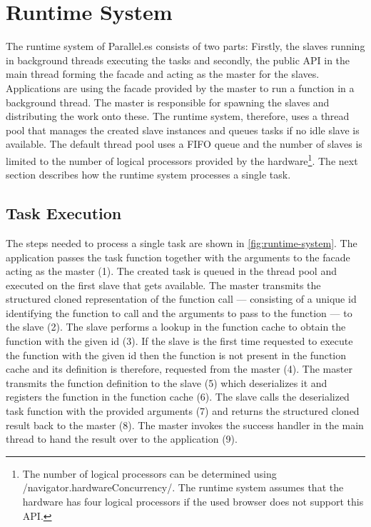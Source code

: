 \section{Runtime System}\label{sec:runtime-system}
The runtime system of Parallel.es consists of two parts: Firstly, the slaves running in background threads executing the tasks and secondly, the public API in the main thread forming the facade and acting as the master for the slaves. Applications are using the facade provided by the master to run a function in a background thread. The master is responsible for spawning the slaves and distributing the work onto these. The runtime system, therefore, uses a thread pool that manages the created slave instances and queues tasks if no idle slave is available. The default thread pool uses a FIFO queue and the number of slaves is limited to the number of logical processors provided by the hardware\footnote{The number of logical processors can be determined using \javascriptinline/navigator.hardwareConcurrency/. The runtime system assumes that the hardware has four logical processors if the used browser does not support this API.}. The next section describes how the runtime system processes a single task. 

\subsection{Task Execution}
The steps needed to process a single task are shown in \cref{fig:runtime-system}. The application passes the task function together with the arguments to the facade acting as the master (1). The created task is queued in the thread pool and executed on the first slave that gets available. The master transmits the structured cloned representation of the function call --- consisting of a unique id identifying the function to call and the arguments to pass to the function --- to the slave (2). The slave performs a lookup in the function cache to obtain the function with the given id (3). If the slave is the first time requested to execute the function with the given id then the function is not present in the function cache and its definition is therefore, requested from the master (4). The master transmits the function definition to the slave (5) which deserializes it and registers the function in the function cache (6). The slave calls the deserialized task function with the provided arguments (7) and returns the structured cloned result back to the master (8). The master invokes the success handler in the main thread to hand the result over to the application (9). 


